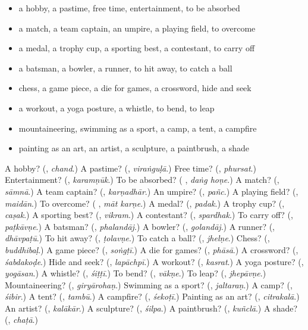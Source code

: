 \begin{itemize}
\raggedright
  \item a hobby, a pastime, free time, entertainment, to be absorbed
  \item a match, a team captain, an umpire, a playing field, to overcome
  \item a medal, a trophy cup, a sporting best, a contestant, to carry off
  \item a batsman, a bowler, a runner, to hit away, to catch a ball
  \item chess, a game piece, a die for games, a crossword, hide and seek
  \item a workout, a yoga posture, a whistle, to bend, to leap
  \item mountaineering, swimming as a sport, a camp, a tent, a campfire
  \item painting as an art, an artist, a sculpture, a paintbrush, a shade
\end{itemize}

\begin{tcolorbox}[breakable,colback=teal!4,colframe=teal!35!black,title={Before you move on}]
A hobby? (\textbf{}, \emph{chand}.) A pastime? (\textbf{}, \emph{viraṅguḷā}.) Free time? (\textbf{}, \emph{phursat}.) Entertainment? (\textbf{}, \emph{karamṇūk}.) To be absorbed? (\textbf{ }, \emph{daṅg hoṇe}.) A match? (\textbf{}, \emph{sāmnā}.) A team captain? (\textbf{}, \emph{karṇadhār}.) An umpire? (\textbf{}, \emph{pañc}.) A playing field? (\textbf{}, \emph{maidān}.) To overcome? (\textbf{ }, \emph{māt karṇe}.) A medal? (\textbf{}, \emph{padak}.) A trophy cup? (\textbf{}, \emph{caṣak}.) A sporting best? (\textbf{}, \emph{vikram}.) A contestant? (\textbf{}, \emph{spardhak}.) To carry off? (\textbf{}, \emph{paṭkāvṇe}.) A batsman? (\textbf{}, \emph{phalandāj}.) A bowler? (\textbf{}, \emph{golandāj}.) A runner? (\textbf{}, \emph{dhāvpaṭū}.) To hit away? (\textbf{}, \emph{ṭolavṇe}.) To catch a ball? (\textbf{}, \emph{jhelṇe}.) Chess? (\textbf{}, \emph{buddhibaḷ}.) A game piece? (\textbf{}, \emph{soṅgṭī}.) A die for games? (\textbf{}, \emph{phāsā}.) A crossword? (\textbf{}, \emph{śabdakoḍe}.) Hide and seek? (\textbf{}, \emph{lapāchpī}.) A workout? (\textbf{}, \emph{kasrat}.) A yoga posture? (\textbf{}, \emph{yogāsan}.) A whistle? (\textbf{}, \emph{śiṭṭī}.) To bend? (\textbf{}, \emph{vākṇe}.) To leap? (\textbf{}, \emph{jhepāvṇe}.) Mountaineering? (\textbf{}, \emph{giryārohaṇ}.) Swimming as a sport? (\textbf{}, \emph{jaltaraṇ}.) A camp? (\textbf{}, \emph{śibir}.) A tent? (\textbf{}, \emph{tambū}.) A campfire? (\textbf{}, \emph{śekoṭī}.) Painting as an art? (\textbf{}, \emph{citrakalā}.) An artist? (\textbf{}, \emph{kalākār}.) A sculpture? (\textbf{}, \emph{śilpa}.) A paintbrush? (\textbf{}, \emph{kuñclā}.) A shade? (\textbf{}, \emph{chaṭā}.)
\end{tcolorbox}

